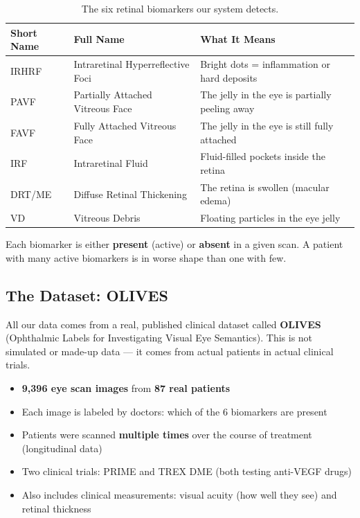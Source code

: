 \documentclass[12pt,a4paper]{article}
\begin{document}
\begin{table}[H]
\centering
\caption{The six retinal biomarkers our system detects.}
\small
\begin{tabular}{@{}lll@{}}
\toprule
\textbf{Short Name} & \textbf{Full Name} & \textbf{What It Means} \\
\midrule
IRHRF & Intraretinal Hyperreflective Foci & Bright dots = inflammation or hard deposits \\
PAVF & Partially Attached Vitreous Face & The jelly in the eye is partially peeling away \\
FAVF & Fully Attached Vitreous Face & The jelly in the eye is still fully attached \\
IRF & Intraretinal Fluid & Fluid-filled pockets inside the retina \\
DRT/ME & Diffuse Retinal Thickening & The retina is swollen (macular edema) \\
VD & Vitreous Debris & Floating particles in the eye jelly \\
\bottomrule
\end{tabular}
\end{table}

Each biomarker is either \textbf{present} (active) or \textbf{absent} in a given scan. A patient with many active biomarkers is in worse shape than one with few.

\subsection{The Dataset: OLIVES}

All our data comes from a real, published clinical dataset called \textbf{OLIVES} (Ophthalmic Labels for Investigating Visual Eye Semantics). This is not simulated or made-up data --- it comes from actual patients in actual clinical trials.

\begin{itemize}[nosep]
  \item \textbf{9,396 eye scan images} from \textbf{87 real patients}
  \item Each image is labeled by doctors: which of the 6 biomarkers are present
  \item Patients were scanned \textbf{multiple times} over the course of treatment (longitudinal data)
  \item Two clinical trials: PRIME and TREX DME (both testing anti-VEGF drugs)
  \item Also includes clinical measurements: visual acuity (how well they see) and retinal thickness
\end{itemize}
\end{document}
